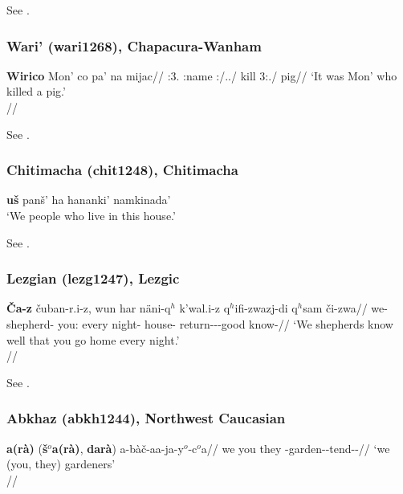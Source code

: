 \documentclass[A4paper]{article}
\begin{document}
See \citet[28]{costello1969}.

\subsubsection{Wari' (wari1268), Chapacura-Wanham}

\ex \begingl
\gla \textbf{Wirico} Mon' co pa' na mijac//
\glb \Emph:3\Sg.\M{} \M:name \Infl:\M/\F.\Real.\Pst/\Prs{} kill 3\Sg:\Real.\Pst/\Prs{} pig//
\glft `It was Mon' who killed a pig.'\\\citep[after][303, (570a)]{everettkern1997}//
\endgl
\xe

See \citet[303, 310]{everettkern1997}.

\newpage

\subsubsection{Chitimacha (chit1248), Chitimacha}

\ex \textbf{\textglotstop{}u\v{s}} pan\v{s}' ha hananki' namkinada'\\
`We people who live in this house.'\\
\citep[333]{swadesh1967}\xe

See \citet[333]{swadesh1967}.

\subsubsection{Lezgian (lezg1247), Lezgic}

\ex 
\begingl
\gla \textbf{\v{C}a-z} \v{c}uban-r.i-z, wun har näni-q$^h$ k'wal.i-z q$^h$ifi-zwazj-di q$^h$sam \v{c}i-zwa//
\glb we-\Dat{} shepherd-\Dat{} you:\Abs{} every night-\Postess{} house-\Dat{} return-\Ipfv-\Ptcp-\Nmlz good know-\Ipfv//
\glft `We shepherds know well that you go home every night.' \\\citep[after][259, (682a)]{haspelmath1993}//
\endgl
\xe

See \citet[259]{haspelmath1993}.

\subsubsection{Abkhaz (abkh1244), Northwest Caucasian}

\ex 
\begingl
\gla \textbf{\textcrh{}a(rà)} (\textbf{\v{s}$^o$a(rà)}, \textbf{darà}) a-bà\textcrh\v{c}-aa-ja-y$^o$-c$^o$a//
\glb we you they \Art-garden-\Prev-tend-\Aarg{}-\Pl//
\glft `we (you, they) gardeners' \\\citep[159]{hewitt1989}//
\endgl
\xe
\end{document}
